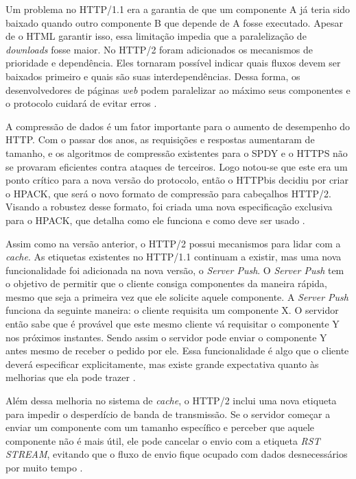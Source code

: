 Um problema no HTTP/1.1 era a garantia de que um componente A já teria sido baixado quando outro componente B que depende de A fosse executado. Apesar de o HTML garantir isso, essa limitação impedia que a paralelização de \textit{downloads} fosse maior. No HTTP/2 foram adicionados os mecanismos de prioridade e dependência. Eles tornaram possível indicar quais fluxos devem ser baixados primeiro e quais são suas interdependências. Dessa forma, os desenvolvedores de páginas \textit{web} podem paralelizar ao máximo seus componentes e o protocolo cuidará de evitar erros \cite{HTTP2Explained}.

A compressão de dados é um fator importante para o aumento de desempenho do HTTP. Com o passar dos anos, as requisições e respostas aumentaram de tamanho, e os algoritmos de compressão existentes para o SPDY e o HTTPS não se provaram eficientes contra ataques de terceiros. Logo notou-se que este era um ponto crítico para a nova versão do protocolo, então o HTTPbis decidiu por criar o HPACK, que será o novo formato de compressão para cabeçalhos HTTP/2. Visando a robustez desse formato, foi criada uma nova especificação exclusiva para o HPACK, que detalha como ele funciona e como deve ser usado \cite{HPACKSpec}.

Assim como na versão anterior, o HTTP/2 possui mecanismos para lidar com a \textit{cache}. As etiquetas existentes no HTTP/1.1 continuam a existir, mas uma nova funcionalidade foi adicionada na nova versão, o \textit{Server Push}. O \textit{Server Push} tem o objetivo de permitir que o cliente consiga componentes da maneira rápida, mesmo que seja a primeira vez que ele solicite aquele componente. A \textit{Server Push} funciona da seguinte maneira: o cliente requisita um componente X. O servidor então sabe que é provável que este mesmo cliente vá requisitar o componente Y nos próximos instantes. Sendo assim o servidor pode enviar o componente Y antes mesmo de receber o pedido por ele. Essa funcionalidade é algo que o cliente deverá especificar explicitamente, mas existe grande expectativa quanto às melhorias que ela pode trazer \cite{HTTP2Explained}.

Além dessa melhoria no sistema de \textit{cache}, o HTTP/2 inclui uma nova etiqueta para impedir o desperdício de banda de transmissão. Se o servidor começar a enviar um componente com um tamanho específico e perceber que aquele componente não é mais útil, ele pode cancelar o envio com a etiqueta \textit{RST STREAM}, evitando que o fluxo de envio fique ocupado com dados desnecessários por muito tempo \cite{HTTP2Explained}.

